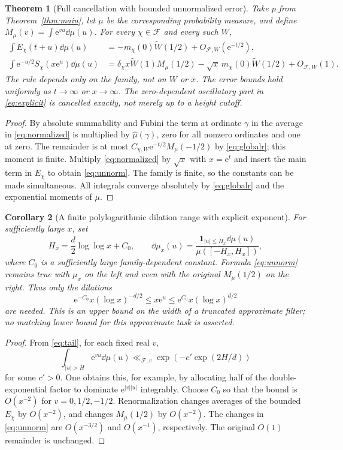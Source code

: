 \documentclass[11pt]{article}
\newtheorem{theorem}{Theorem}[section]
\newtheorem{corollary}[theorem]{Corollary}
\theoremstyle{remark}\newtheorem{remark}[theorem]{Remark}
\newcommand{\ee}{\mathrm e}\newcommand{\abs}[1]{\lvert#1\rvert}
\newcommand{\spec}{\mathcal F}
\begin{document}
\begin{theorem}[Full cancellation with bounded unnormalized error]\label{thm:prime}
Take $p$ from Theorem~\ref{thm:main}, let $\mu$ be the corresponding probability measure, and define $M_\mu(v)=\int\ee^{vu}\dd\mu(u)$. For every $\chi\in\spec$ and every such $W$,
\begin{align}
 \int E_\chi(t+u)\dd\mu(u)&=-m_\chi(0)\widetilde W(1/2)+O_{\spec,W}(\ee^{-t/2}),\label{eq:normalized}\\
 \int\ee^{-u/2} S_\chi(x\ee^u)\dd\mu(u)&=\delta_\chi x\widetilde W(1)M_\mu(1/2)
 -\sqrt x\,m_\chi(0)\widetilde W(1/2)+O_{\spec,W}(1).\label{eq:unnorm}
\end{align}
The rule depends only on the family, not on $W$ or $x$. The error bounds hold uniformly as $t\to\infty$ or $x\to\infty$. The zero-dependent oscillatory part in \eqref{eq:explicit} is cancelled exactly, not merely up to a height cutoff.
\end{theorem}
\begin{proof}
By absolute summability and Fubini the term at ordinate $\gamma$ in the average in \eqref{eq:normalized} is multiplied by $\widehat\mu(\gamma)$, zero for all nonzero ordinates and one at zero. The remainder is at most $C_{\chi,W}\ee^{-t/2}M_\mu(-1/2)$ by \eqref{eq:globalr}; this moment is finite. Multiply \eqref{eq:normalized} by $\sqrt x$ with $x=\ee^t$ and insert the main term in $E_\chi$ to obtain \eqref{eq:unnorm}. The family is finite, so the constants can be made simultaneous. All integrals converge absolutely by \eqref{eq:globalr} and the exponential moments of $\mu$.
\end{proof}

\begin{corollary}[A finite polylogarithmic dilation range with explicit exponent]\label{cor:trunc}
For sufficiently large $x$, set
\[
 H_x=\frac d2\log\log x+C_0,
 \qquad \dd\mu_x(u)=\frac{\mathbf1_{|u|\le H_x}\dd\mu(u)}{\mu([-H_x,H_x])},
\]
where $C_0$ is a sufficiently large family-dependent constant. Formula \eqref{eq:unnorm} remains true with $\mu_x$ on the left and even with the original $M_\mu(1/2)$ on the right. Thus only the dilations
\[
 \ee^{-C_0}x(\log x)^{-d/2}\le x\ee^u\le \ee^{C_0}x(\log x)^{d/2}
\]
are needed. This is an upper bound on the width of a truncated approximate filter; no matching lower bound for this \emph{approximate} task is asserted.
\end{corollary}
\begin{proof}
From \eqref{eq:tail}, for each fixed real $v$,
\[
 \int_{|u|>H}\ee^{v u}\dd\mu(u)\ll_{\spec,v}\exp(-c'\exp(2H/d))
\]
for some $c'>0$. One obtains this, for example, by allocating half of the double-exponential factor to dominate $\ee^{|v||u|}$ integrably. Choose $C_0$ so that the bound is $O(x^{-2})$ for $v=0,1/2,-1/2$. Renormalization changes averages of the bounded $E_\chi$ by $O(x^{-2})$, and changes $M_\mu(1/2)$ by $O(x^{-2})$. The changes in \eqref{eq:unnorm} are $O(x^{-3/2})$ and $O(x^{-1})$, respectively. The original $O(1)$ remainder is unchanged.
\end{proof}
\end{document}
